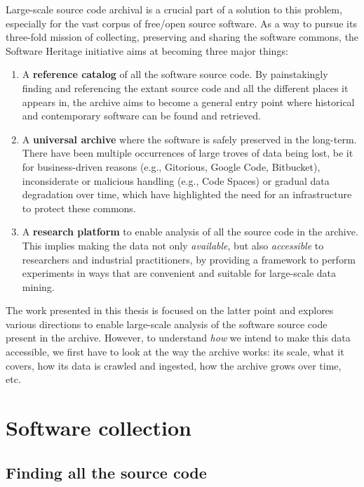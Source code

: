 Large-scale source code archival is a crucial part of a solution to this
problem, especially for the vast corpus of free/open source software.
As a way to pursue its three-fold mission of collecting, preserving and
sharing the software commons, the Software Heritage initiative aims at becoming
three major things:

\begin{enumerate}
    \item A \textbf{reference catalog} of all the software source code. By
        painstakingly finding and referencing the extant source code and
        all the different places it appears in, the archive aims to become a
        general entry point where historical and contemporary software can be
        found and retrieved.
    \item A \textbf{universal archive} where the software is safely preserved
        in the long-term. There have been multiple occurrences of large troves
        of data being lost, be it for business-driven reasons (e.g., Gitorious,
        Google Code, Bitbucket), inconsiderate or malicious handling (e.g.,
        Code Spaces) or gradual data degradation over time, which have
        highlighted the need for an infrastructure to protect these commons.
    \item A \textbf{research platform} to enable analysis of all the source
        code in the archive. This implies making the data not only
        \emph{available}, but also \emph{accessible} to researchers and
        industrial practitioners, by providing a framework to perform
        experiments in ways that are convenient and suitable for large-scale
        data mining.
\end{enumerate}

The work presented in this thesis is focused on the latter point and explores
various directions to enable large-scale analysis of the software source code
present in the archive. However, to understand \emph{how} we intend to make
this data accessible, we first have to look at the way the archive works: its
scale, what it covers, how its data is crawled and ingested, how the archive
grows over time, etc.

\section{Software collection}

\subsection{Finding all the source code}

